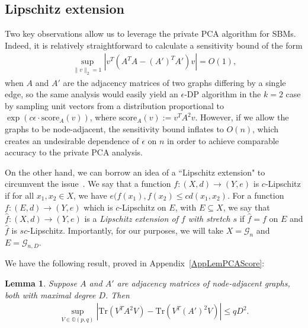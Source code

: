 \documentclass{article}
\newtheorem{lemma}{Lemma}
\newcommand{\Tr}{\ensuremath{\mathrm{Tr}}}
\begin{document}
\subsection{Lipschitz extension}

Two key observations allow us to leverage the private PCA algorithm for SBMs. Indeed, it is relatively straightforward to calculate a sensitivity bound of the form
\begin{align*}
\sup_{\|v\|_2 = 1} |v^T(A^TA - (A')^TA') v| = O(1),
\end{align*}
when $A$ and $A'$ are the adjacency matrices of two graphs differing by a single edge, so the same analysis would easily yield an $\epsilon$-DP algorithm in the $k=2$ case by sampling unit vectors from a distribution proportional to $\exp\left(c\epsilon \cdot \text{score}_A(v)\right)$, where $\text{score}_A(v) := v^TA^2v$. However, if we allow the graphs to be node-adjacent, the sensitivity bound inflates to $O(n)$, which creates an undesirable dependence of $\epsilon$ on $n$ in order to achieve comparable accuracy to the private PCA analysis.

On the other hand, we can borrow an idea of a ``Lipschitz extension" to circumvent the issue~\cite{naor2015}. We say that a function $f: (X,d) \rightarrow (Y,e)$ is $c$-Lipschitz if for all $x_1,x_2 \in X$, we have $e(f(x_1),f(x_2) \leq c d(x_1,x_2)$.
For a function $f:(E,d) \rightarrow (Y,e)$ which is $c$-Lipschitz on $E$, with $E \subseteq X$, we say that $\hat{f}: (X,d) \rightarrow (Y,e)$ is a \emph{Lipschitz extension of $f$ with stretch $s$} if $\hat{f}=f$ on $E$ and $\hat{f}$ is $sc$-Lipschitz. Importantly, for our purposes, we will take $X = \mathcal{G}_n$ and $E = \mathcal{G}_{n,D}$.

We have the following result, proved in Appendix~\ref{AppLemPCAScore}:

\begin{lemma}
\label{LemPCAScore}
Suppose $A$ and $A'$ are adjacency matrices of node-adjacent graphs, both with maximal degree $D$. Then
\begin{align*}
\sup_{V \in \mathbb{O}(p,q)} |\Tr(V^TA^2V) - \Tr(V^T(A')^2V)| \le qD^2.
\end{align*}
\end{lemma}
\end{document}
